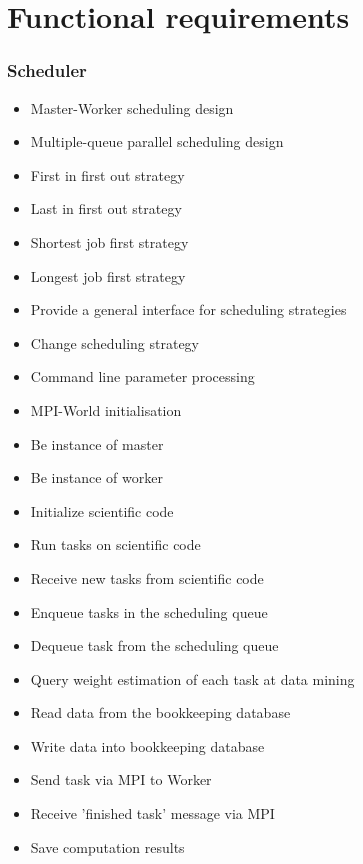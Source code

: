 {


\setcounter{func}{10}
\renewcommand{\labelitemi}{
	\ifnum \value{func}<10$/F 0\arabic{func} /$\addtocounter{func}{10}
	\else $/F \arabic{func} /$\addtocounter{func}{10}\fi
	}

\section{Functional requirements} 
	
	\subsubsection{Scheduler}
	
		\begin{itemize}
			\item Master-Worker scheduling design
			\item Multiple-queue parallel scheduling design
			\item First in first out strategy
			\item Last in first out strategy
			\item Shortest job first strategy
			\item Longest job first strategy 
			\item Provide a general interface for scheduling strategies
			\item Change scheduling strategy
			\item Command line parameter processing
			\item MPI-World initialisation
			\item Be instance of master
			\item Be instance of worker
			\item Initialize scientific code
			\item Run tasks on scientific code 
			\item Receive new tasks from scientific code
			\item Enqueue tasks in the scheduling queue
			\item Dequeue task from the scheduling queue
			\item Query weight estimation of each task at data mining
			\item Read data from the bookkeeping database
			\item Write data into bookkeeping database
			\item Send task via MPI to Worker
			\item Receive 'finished task' message via MPI  
			\item Save computation results
		\end{itemize}
	
}
